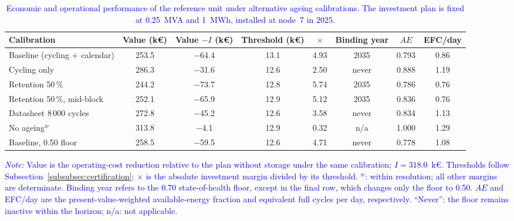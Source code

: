\documentclass[preprint,12pt]{elsarticle}
\begin{document}
\begin{table}[htbp!]
    \centering
    \caption{\textcolor{blue}{Economic and operational performance of the reference unit under alternative ageing calibrations. The investment plan is fixed at 0.25~MVA and 1~MWh, installed at node~7 in 2025.}}
    \label{tab:res_ageing}
    \scriptsize\setlength{\tabcolsep}{3pt}
    \begin{tabular}{l c c c c c c c}
        \toprule
        Calibration & Value (k\euro) & Value $- I$ (k\euro) & Threshold (k\euro) & $\times$ & Binding year & $AE$ & EFC/day \\
        \midrule
        Baseline (cycling + calendar)   & 253.5 & $-$64.4 & 13.1 & 4.93 & 2035  & 0.793 & 0.86 \\
        Cycling only                    & 286.3 & $-$31.6 & 12.6 & 2.50 & never & 0.888 & 1.19 \\
        Retention 50\,\%                & 244.2 & $-$73.7 & 12.8 & 5.74 & 2035  & 0.786 & 0.76 \\
        Retention 50\,\%, mid-block     & 252.1 & $-$65.9 & 12.9 & 5.12 & 2035  & 0.836 & 0.76 \\
        Datasheet 8\,000 cycles         & 272.8 & $-$45.2 & 12.6 & 3.58 & never & 0.834 & 1.13 \\
        No ageing$^{w}$ & 313.8 & $-$4.1 & 12.9 & 0.32 & n/a & 1.000 & 1.29 \\
        \midrule
        Baseline, 0.50 floor & 258.5 & $-$59.5 & 12.6 & 4.71 & never & 0.778 & 1.08 \\
        \bottomrule
    \end{tabular}
    \par\smallskip
    \begin{minipage}{\linewidth}
        \scriptsize
        \raggedright
        \textcolor{blue}{%
            \textit{Note:} Value is the operating-cost reduction relative to the plan without storage under the same calibration; $I=318.0$~k\euro{}. Thresholds follow Subsection~\ref{subsubsec:certification}; $\times$ is the absolute investment margin divided by its threshold. $^{w}$: within resolution; all other margins are determinate. Binding year refers to the 0.70 state-of-health floor, except in the final row, which changes only the floor to 0.50. $AE$ and EFC/day are the present-value-weighted available-energy fraction and equivalent full cycles per day, respectively. ``Never'': the floor remains inactive within the horizon; n/a: not applicable.
    }
    \end{minipage}
\end{table}
\end{document}
